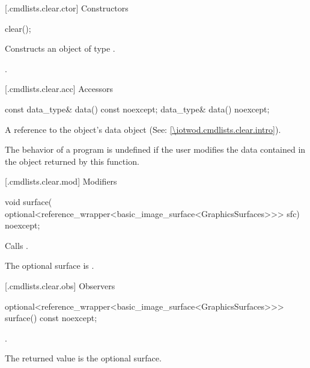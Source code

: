  [\iotwod.cmdlists.clear.ctor] {Constructors}%

%
\begin{itemdecl}
clear();
\end{itemdecl}
\begin{itemdescr}
\pnum
\effects Constructs an object of type .

\pnum
\postconditions {}.
\end{itemdescr}

 [\iotwod.cmdlists.clear.acc] {Accessors}%

%
\begin{itemdecl}
const data_type& data() const noexcept;
data_type& data() noexcept;
\end{itemdecl}
\begin{itemdescr}
\pnum
\returns A reference to the  object's data object (See: \ref{\iotwod.cmdlists.clear.intro}).

\pnum
\remarks The behavior of a program is undefined if the user modifies the data contained in the  object returned by this function.
\end{itemdescr}

 [\iotwod.cmdlists.clear.mod] {Modifiers}%

%
\begin{itemdecl}
void surface(
  optional<reference_wrapper<basic_image_surface<GraphicsSurfaces>>> sfc) 
  noexcept;
\end{itemdecl}
\begin{itemdescr}
\pnum
\effects Calls .

\pnum
\remarks The optional surface is .
\end{itemdescr}

 [\iotwod.cmdlists.clear.obs] {Observers}%

%
\begin{itemdecl}
optional<reference_wrapper<basic_image_surface<GraphicsSurfaces>>> 
  surface() const noexcept;
\end{itemdecl}
\begin{itemdescr}
\pnum
\returns {}.

\pnum
\remarks
The returned value is the optional surface.
\end{itemdescr}

